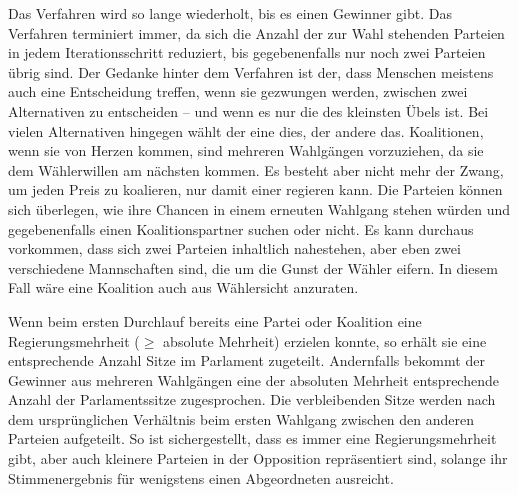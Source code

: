 Das Verfahren wird so lange wiederholt, bis es einen Gewinner gibt. Das Verfahren terminiert
immer, da sich die Anzahl der zur Wahl stehenden Parteien in jedem Iterationsschritt reduziert,
bis gegebenenfalls nur noch zwei Parteien übrig sind. Der Gedanke hinter dem Verfahren ist der,
dass Menschen meistens auch eine Entscheidung treffen, wenn sie gezwungen werden, zwischen zwei
Alternativen zu entscheiden -- und wenn es nur die des kleinsten Übels ist. Bei vielen
Alternativen hingegen wählt der eine dies, der andere das. Koalitionen, wenn sie von Herzen
kommen, sind mehreren Wahlgängen vorzuziehen, da sie dem Wählerwillen am nächsten kommen. Es
besteht aber nicht mehr der Zwang, um jeden Preis zu koalieren, nur damit einer regieren kann.
Die Parteien können sich überlegen, wie ihre Chancen in einem erneuten Wahlgang stehen würden
und gegebenenfalls einen Koalitionspartner suchen oder nicht. Es kann durchaus vorkommen, dass
sich zwei Parteien inhaltlich nahestehen, aber eben zwei verschiedene Mannschaften sind, die um
die Gunst der Wähler eifern. In diesem Fall wäre eine Koalition auch aus Wählersicht anzuraten.

Wenn beim ersten Durchlauf bereits eine Partei oder Koalition eine Regierungsmehrheit ($\geq$
absolute Mehrheit) erzielen konnte, so erhält sie eine entsprechende Anzahl Sitze im Parlament
zugeteilt. Andernfalls bekommt der Gewinner aus mehreren Wahlgängen eine der absoluten Mehrheit
entsprechende Anzahl der Parlamentssitze zugesprochen. Die verbleibenden Sitze werden nach dem
ursprünglichen Verhältnis beim ersten Wahlgang zwischen den anderen Parteien aufgeteilt. So ist
sichergestellt, dass es immer eine Regierungsmehrheit gibt, aber auch kleinere Parteien in der
Opposition repräsentiert sind, solange ihr Stimmenergebnis für wenigstens einen Abgeordneten
ausreicht.

\bigskip


